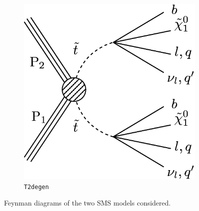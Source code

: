 \begin{figure}[h!]
\begin{subfigure}[b]{0.46\textwidth}
    \includegraphics[width=\textwidth]{Figs/feynman/T2DegenerateStop_feyn.png}
    \caption{\texttt{T2degen}}
    \label{fig:t2degen_feyn}
  \end{subfigure}
  \caption{Feynman diagrams of the two SMS models considered.}
  \label{fig:model_feynman}
\end{figure}